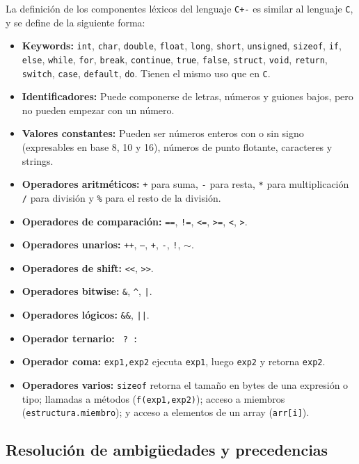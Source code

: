 \documentclass[12pt]{article}
\newcommand{\C}{\texttt{C}}
\begin{document}
La definici\'on de los componentes l\'exicos del lenguaje \texttt{C+-} es similar al lenguaje \C, y se define de la siguiente forma:
\begin{itemize}
    \item \textbf{Keywords:} \texttt{int}, \texttt{char}, \texttt{double}, \texttt{float}, \texttt{long}, \texttt{short}, \texttt{unsigned}, \texttt{sizeof}, \texttt{if}, \texttt{else}, \texttt{while}, \texttt{for}, \texttt{break}, \texttt{continue}, \texttt{true}, \texttt{false}, \texttt{struct}, \texttt{void}, \texttt{return}, \texttt{switch}, \texttt{case}, \texttt{default}, \texttt{do}. Tienen el mismo uso que en \C.
    \item \textbf{Identificadores:} Puede componerse de letras, n\'umeros y guiones bajos, pero no pueden empezar con un n\'umero.
    \item \textbf{Valores constantes:} Pueden ser n\'umeros enteros con o sin signo (expresables en base 8, 10 y 16), n\'umeros de punto flotante, caracteres y strings.
    \item \textbf{Operadores aritm\'eticos:} \texttt{+} para suma, \texttt{-} para resta, \texttt{*} para multiplicaci\'on \texttt{/} para divisi\'on y \texttt{\%} para el resto de la divisi\'on.
    \item \textbf{Operadores de comparaci\'on:} \texttt{==}, \texttt{!=}, \texttt{<=}, \texttt{>=}, \texttt{<}, \texttt{>}.
    \item \textbf{Operadores unarios:} \texttt{++}, \texttt{--}, \texttt{+}, \texttt{-}, \texttt{!}, $\mathtt\sim$.
    \item \textbf{Operadores de shift:} \texttt{<{}<}, \texttt{>{}>}.
    \item \textbf{Operadores bitwise:} \texttt{\&}, \texttt{\^}, \texttt{|}.
    \item \textbf{Operadores l\'ogicos:} \texttt{\&\&}, \texttt{||}.
    \item \textbf{Operador ternario:} \texttt{ ? : }
    \item \textbf{Operador coma:} \texttt{exp1,exp2} ejecuta \texttt{exp1}, luego \texttt{exp2} y retorna \texttt{exp2}.
    \item \textbf{Operadores varios:} \texttt{sizeof} retorna el tama\~no en bytes de una expresi\'on o tipo; llamadas a m\'etodos (\texttt{f(exp1,exp2)}); acceso a miembros (\texttt{estructura.miembro}); y acceso a elementos de un array (\texttt{arr[i]}).
\end{itemize}

\subsection*{Resoluci\'on de ambig\"uedades y precedencias}
\end{document}
